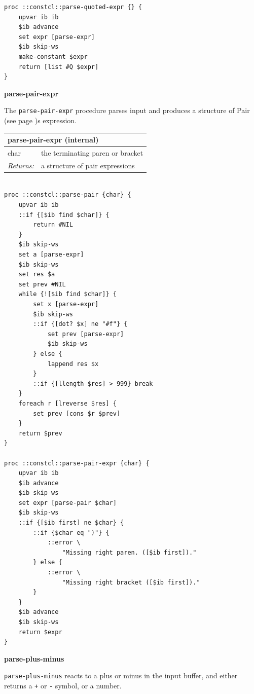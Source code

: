 \documentclass[twoside,9pt]{report}
\begin{document}
\noindent\makebox[\linewidth]{\rule{\linewidth}{0.4pt}}
\begin{lstlisting}
proc ::constcl::parse-quoted-expr {} {
    upvar ib ib
    $ib advance
    set expr [parse-expr]
    $ib skip-ws
    make-constant $expr
    return [list #Q $expr]
}
\end{lstlisting}
\noindent\makebox[\linewidth]{\rule{\linewidth}{0.4pt}}

\textbf{parse-pair-expr}


The \texttt{parse-pair-expr} procedure parses input and produces a structure of Pair (see page \pageref{pairs-and-lists})s expression.

\begin{tabular}{ |l l| }
\hline
\multicolumn{2}{|l|}{parse-pair-expr (internal)} \\
\hline
char & the terminating paren or bracket \\
\textit{Returns:} & a structure of pair expressions \\
\hline
\end{tabular}

\noindent\makebox[\linewidth]{\rule{\linewidth}{0.4pt}}
\begin{lstlisting}
 
proc ::constcl::parse-pair {char} {
    upvar ib ib
    ::if {[$ib find $char]} {
        return #NIL
    }
    $ib skip-ws
    set a [parse-expr]
    $ib skip-ws
    set res $a
    set prev #NIL
    while {![$ib find $char]} {
        set x [parse-expr]
        $ib skip-ws
        ::if {[dot? $x] ne "#f"} {
            set prev [parse-expr]
            $ib skip-ws
        } else {
            lappend res $x
        }
        ::if {[llength $res] > 999} break
    }
    foreach r [lreverse $res] {
        set prev [cons $r $prev]
    }
    return $prev
}
 
proc ::constcl::parse-pair-expr {char} {
    upvar ib ib
    $ib advance
    $ib skip-ws
    set expr [parse-pair $char]
    $ib skip-ws
    ::if {[$ib first] ne $char} {
        ::if {$char eq ")"} {
            ::error \
                "Missing right paren. ([$ib first])."
        } else {
            ::error \
                "Missing right bracket ([$ib first])."
        }
    }
    $ib advance
    $ib skip-ws
    return $expr
}
\end{lstlisting}
\noindent\makebox[\linewidth]{\rule{\linewidth}{0.4pt}}

\textbf{parse-plus-minus}


\texttt{parse-plus-minus} reacts to a plus or minus in the input buffer, and either returns a \texttt{+} or \texttt{-} symbol, or a number.
\end{document}
